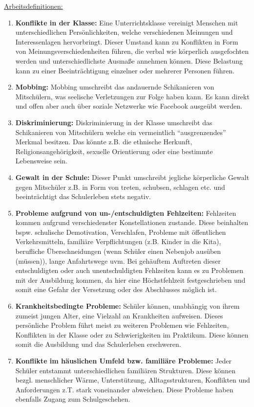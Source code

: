\underline{Arbeitsdefinitionen:}
\begin{enumerate}
	\item \textbf{Konflikte in der Klasse:} Eine Unterrichtsklasse vereinigt Menschen mit unterschiedlichen Persönlichkeiten, welche verschiedenen Meinungen und Interessenlagen hervorbringt. Dieser Umstand kann zu Konflikten in Form von Meinungsverschiedenheiten führen, die verbal wie körperlich ausgefochten werden und unterschiedlichste Ausmaße annehmen können. Diese Belastung kann zu einer Beeinträchtigung einzelner oder mehrerer Personen führen.
	\item \textbf{Mobbing:} Mobbing umschreibt das andauernde Schikanieren von Mitschülern, was seelische Verletzungen zur Folge haben kann. Es kann direkt und offen aber auch über soziale Netzwerke wie Facebook ausgeübt werden.
	\item \textbf{Diskriminierung:} Diskriminierung in der Klasse umschreibt das Schikanieren von Mitschülern welche ein vermeintlich "`ausgrenzendes"' Merkmal besitzen. Das könnte z.B. die ethnische Herkunft, Religionsangehörigkeit, sexuelle Orientierung oder eine bestimmte Lebensweise sein.
	\item \textbf{Gewalt in der Schule:} Dieser Punkt umschreibt jegliche körperliche Gewalt gegen Mitschüler z.B. in Form von treten, schubsen, schlagen etc. und beeinträchtigt das Schulerleben stets negativ.
	\item \textbf{Probleme aufgrund von un-/entschuldigten Fehlzeiten:} Fehlzeiten kommen aufgrund verschiedenster Konstellationen zustande. Diese beinhalten bspw. schulische Demotivation, Verschlafen, Probleme mit öffentlichen Verkehrsmitteln, familiäre Verpflichtungen (z.B. Kinder in die Kita), berufliche Überschneidungen (wenn Schüler einen Nebenjob ausüben (müssen)), lange Anfahrtswege uvm. Bei gehäuftem Auftreten dieser entschuldigten oder auch unentschuldigten Fehlzeiten kann es zu Problemen mit der Ausbildung kommen, da hier eine Höchstfehlzeit festgeschrieben und somit eine Gefahr der Versetzung oder des Abschlusses möglich ist.
	\item \textbf{Krankheitsbedingte Probleme:} Schüler können, unabhängig von ihrem zumeist jungen Alter, eine Vielzahl an Krankheiten aufweisen. Dieses persönliche Problem führt meist zu weiteren Problemen wie Fehlzeiten, Konflikten in der Klasse oder zu Schwierigkeiten im Praktikum. Diese können somit die Ausbildung und das Schulerleben erschweren.
	\item \textbf{Konflikte im häuslichen Umfeld bzw. familiäre Probleme:} Jeder Schüler entstammt unterschiedlichen familiären Strukturen. Diese können bezgl. menschlicher Wärme, Unterstützung, Alltagsstrukturen, Konflikten und Anforderungen z.T. stark voneinander abweichen. Diese Probleme haben ebenfalls Zugang zum Schulgeschehen. 

\end{enumerate}
